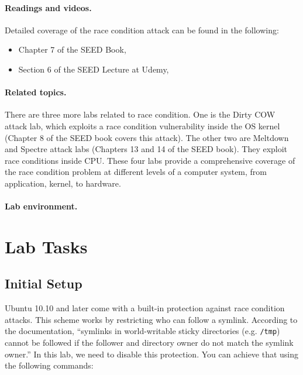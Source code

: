 \paragraph{Readings and videos.}
Detailed coverage of the race condition attack can be found in the following:

\begin{itemize}
\item Chapter 7 of the SEED Book, \seedbook
\item Section 6 of the SEED Lecture at Udemy, \seedcsvideo
\end{itemize}


\paragraph{Related topics.}
There are three more labs related to race condition. One 
is the Dirty COW attack lab, which exploits a race condition vulnerability
inside the OS kernel (Chapter 8 of the SEED book covers this attack).
The other two are Meltdown and Spectre attack labs (Chapters 13 and 14 
of the SEED book). They exploit 
race conditions inside CPU. These four labs provide 
a comprehensive coverage of the race condition problem at 
different levels of a computer system, from application, kernel, 
to hardware. 


\paragraph{Lab environment.} \seedenvironment


\section{Lab Tasks}


\subsection{Initial Setup}

Ubuntu 10.10 and later come with a built-in protection against race condition 
attacks. This scheme works by restricting who can follow a symlink. 
According to the documentation, ``symlinks in world-writable sticky 
directories (e.g. {\tt /tmp}) cannot be followed if the follower and directory 
owner do not match the symlink owner.''
In this lab, we need to disable this protection. You can achieve
that using the following commands:

